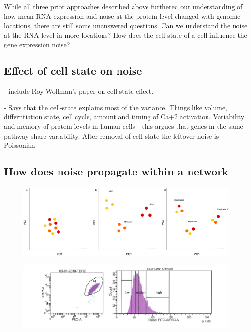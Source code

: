 While all three prior approaches described above furthered our understanding of how mean RNA expression and noise at the protein level changed with genomic locations, there are still some unanswered questions. Can we understand the noise at the RNA level in more locations? How does the cell-state of a cell influence the gene expression noise?


\subsection{Effect of cell state on noise}
- include Roy Wollman's paper on cell state effect. 

- Says that the cell-state explains most of the variance. Things like volume, differntiation state, cell cycle, amount and timing of Ca+2 activation.
Variability and memory of protein levels in human cells - this argues that genes in the same pathway share variability. After removal of cell-state the leftover noise is Poissonian


\subsection{ How does noise propagate within a network}

\begin{figure}[t!]  
    \centering
    \includegraphics[width=\linewidth, scale=0.5]{figures/intro/intro_clustering_expectedresults.pdf}
    \caption[]{%
        \textbf{}
    }
    \label{fig:aim1_task1}
\end{figure}



\begin{figure}[t!]  
    \centering
    \includegraphics[width=\linewidth]{figures/intro/intro_tdh2_facs.png}
    \caption[]{%
        \textbf{}
    }
    \label{fig:tdh2_pca}
\end{figure}


